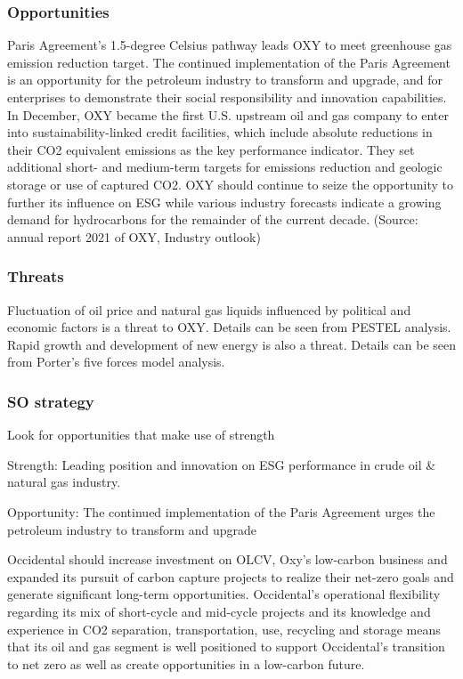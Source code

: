 \documentclass[
	a4paper, %
	12pt,%
]{CSSullivanBusinessReport}
\begin{document}
\begin{fullwidth}
\subsubsection{Opportunities}
Paris Agreement’s 1.5-degree Celsius pathway leads OXY to meet greenhouse gas emission reduction target. The continued implementation of the Paris Agreement is an opportunity for the petroleum industry to transform and upgrade, and for enterprises to demonstrate their social responsibility and innovation capabilities. In December, OXY became the first U.S. upstream oil and gas company to enter into sustainability-linked credit facilities, which include absolute reductions in their CO2 equivalent emissions as the key performance indicator. They set additional short- and medium-term targets for emissions reduction and geologic storage or use of captured CO2. OXY should continue to seize the opportunity to further its influence on ESG while various industry forecasts indicate a growing demand for hydrocarbons for the remainder of the current decade. (Source: annual report 2021 of OXY, Industry outlook)
\subsubsection{Threats} 
Fluctuation of oil price and natural gas liquids influenced by political and economic factors is a threat to OXY. Details can be seen from PESTEL analysis. Rapid growth and development of new energy is also a threat. Details can be seen from Porter’s five forces model analysis.
\subsubsection{SO strategy}
Look for opportunities that make use of strength\par
Strength: Leading position and innovation on ESG performance in crude oil \& natural gas industry.\par
Opportunity: The continued implementation of the Paris Agreement urges the petroleum industry to transform and upgrade\par
Occidental should increase investment on OLCV, Oxy’s low-carbon business and expanded its pursuit of carbon capture projects to realize their net-zero goals and generate significant long-term opportunities. Occidental’s operational flexibility regarding its mix of short-cycle and mid-cycle projects and its knowledge and experience in CO2 separation, transportation, use, recycling and storage means that its oil and gas segment is well positioned to support Occidental’s transition to net zero as well as create opportunities in a low-carbon future.

\end{fullwidth}
\end{document}
